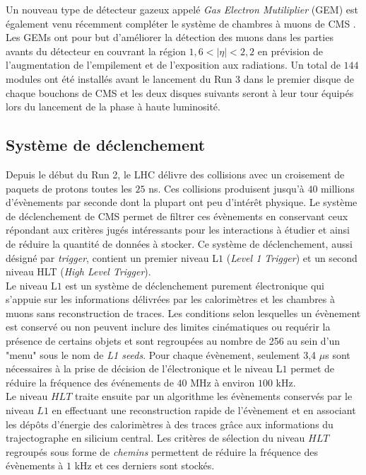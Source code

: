Un nouveau type de détecteur gazeux appelé \textit{Gas Electron Mutiliplier} (GEM) est également venu récemment compléter le système de chambres à muons de CMS \cite{GEM1,GEM2}. Les GEMs ont pour but d'améliorer la détection des muons dans les parties avants du détecteur en couvrant la région $1,6<|\eta|<2,2$ en prévision de l'augmentation de l'empilement et de l'exposition aux radiations. Un total de $144$ modules ont été installés avant le lancement du Run 3 dans le premier disque de chaque bouchons de CMS et les deux disques suivants seront à leur tour équipés lors du lancement de la phase à haute luminosité. 

\subsection{Système de déclenchement}

Depuis le début du Run 2, le LHC délivre des collisions avec un croisement de paquets de protons toutes les $25$ ns. Ces collisions produisent jusqu'à $40$ millions d'évènements par seconde dont la plupart ont peu d'intérêt physique. Le système de déclenchement de CMS permet de filtrer ces évènements en conservant ceux répondant aux critères jugés intéressants pour les interactions à étudier et ainsi de réduire la quantité de données à stocker. Ce système de déclenchement, aussi désigné par \textit{trigger}, contient un premier niveau L$1$ (\textit{Level 1 Trigger}) et un second niveau HLT (\textit{High Level Trigger}). \\

Le niveau L$1$ est un système de déclenchement purement électronique qui s'appuie sur les informations délivrées par les calorimètres et les chambres à muons sans reconstruction de traces. Les conditions selon lesquelles un évènement est conservé ou non peuvent inclure des limites cinématiques ou requérir la présence de certains objets et sont regroupées au nombre de 256 au sein d'un "menu" sous le nom de \textit{L1 seeds}. Pour chaque évènement, seulement 3,4 $\mu$s sont nécessaires à la prise de décision de l'électronique et le niveau L$1$ permet de réduire la fréquence des événements de $40$ MHz à environ $100$ kHz. \\

Le niveau $HLT$ traite ensuite par un algorithme les évènements conservés par le niveau $L1$ en effectuant une reconstruction rapide de l'évènement et en associant les dépôts d'énergie des calorimètres à des traces grâce aux informations du trajectographe en silicium central. Les critères de sélection du niveau $HLT$ regroupés sous forme de \textit{chemins} permettent de réduire la fréquence des évènements à $1$ kHz et ces derniers sont stockés. \\